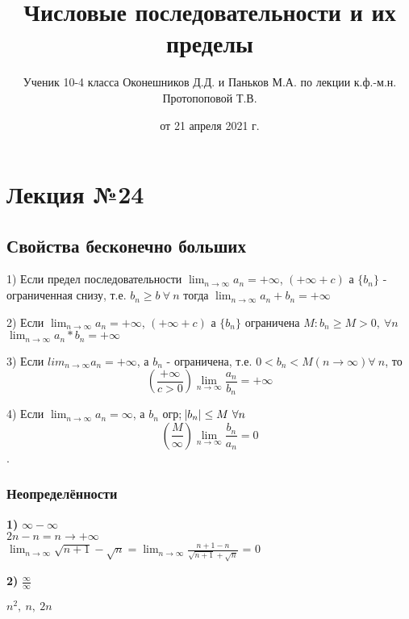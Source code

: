 \documentclass{article}
\begin{document}
    \title{Числовые последовательности и их пределы}
    \author{Ученик 10-4 класса Оконешников Д.Д. и Паньков М.А. по лекции к.ф.-м.н. Протопоповой Т.В.}
    \date{от 21 апреля 2021 г.}
    \maketitle

    \section{Лекция №24}
    \subsection{Свойства бесконечно больших}

    1) Если предел последовательности \( \lim_{n \rightarrow \infty }a_n = + \infty \), \( (+\infty + c) \) а \( \{b_n\} \) - ограниченная снизу, т.е. \( b_n \geq b\ \forall\ n \) тогда \(\lim_{n \rightarrow \infty}{a_n + b_n} = +\infty\)
       
    2) Если \( \lim_{n \rightarrow \infty }a_n = +\infty \), \( (+\infty + c) \) а \( \{ b_n \} \) ограничена \( M: b_n \geq M > 0,\ \forall n \)
    \(\lim_{n \rightarrow \infty}{a_n * b_n} = +\infty\)

    3) Если \( lim_{n \rightarrow \infty }a_n = +\infty \), а \( b_n \) - ограничена, т.е. \( 0 < b_n < M (n \rightarrow \infty ) \forall\ n \), то \[ (\frac{+\infty}{c > 0}) \lim_{n \rightarrow \infty}{\frac{a_n}{b_n}} = +\infty\]
    
    4) Если \(\lim_{n \rightarrow \infty}{a_n} = \infty\), а \(b_n\) огр; \(\abs{b_n} \leq M\  \forall n\) \[ (\frac{M}{\infty}) \lim_{n \rightarrow \infty }\frac{b_n}{a_n} = 0 \].

    \subsubsection{Неопределённости}

    \textbf{1)} \(\infty - \infty\)
    \\ \(2n - n = n \rightarrow +\infty\)
    \\ \(\lim_{n \rightarrow \infty}{\sqrt{n+1} - \sqrt{n}} = \lim_{n \rightarrow \infty}{\frac{n+1-n}{\sqrt{n+1}+\sqrt{n}}}\) = 0

    \textbf{2)} \( \frac{\infty}{\infty} \)

    \( n^2,\ n,\ 2n \)
    
\end{document}
